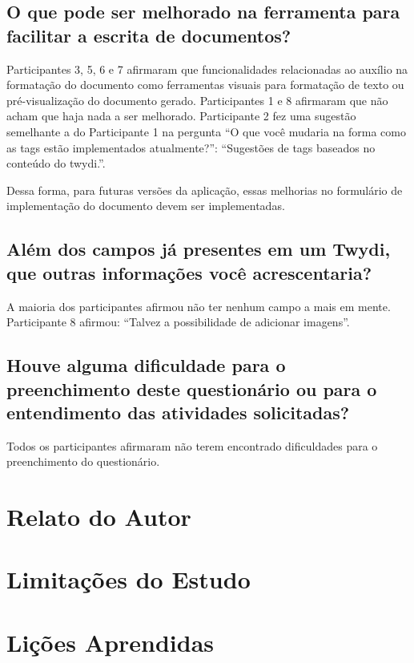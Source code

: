 \subsection{O que pode ser melhorado na ferramenta para facilitar a escrita de documentos?}

Participantes 3, 5, 6 e 7 afirmaram que funcionalidades relacionadas ao auxílio na formatação do documento como ferramentas visuais para formatação de texto ou pré-visualização do documento gerado. Participantes 1 e 8 afirmaram que não acham que haja nada a ser melhorado. Participante 2 fez uma sugestão semelhante a do Participante 1 na pergunta ``O que você mudaria na forma como as tags estão implementados atualmente?'': ``Sugestões de tags baseados no conteúdo do twydi.''.

Dessa forma, para futuras versões da aplicação, essas melhorias no formulário de implementação do documento devem ser implementadas.

\subsection{Além dos campos já presentes em um Twydi, que outras informações você acrescentaria?}

A maioria dos participantes afirmou não ter nenhum campo a mais em mente. Participante 8 afirmou: ``Talvez a possibilidade de adicionar imagens''.

\subsection{Houve alguma dificuldade para o preenchimento deste questionário ou para o entendimento das atividades solicitadas?}

Todos os participantes afirmaram não terem encontrado dificuldades para o preenchimento do questionário.

\section{Relato do Autor}
\section{Limitações do Estudo}


\section{Lições Aprendidas}
